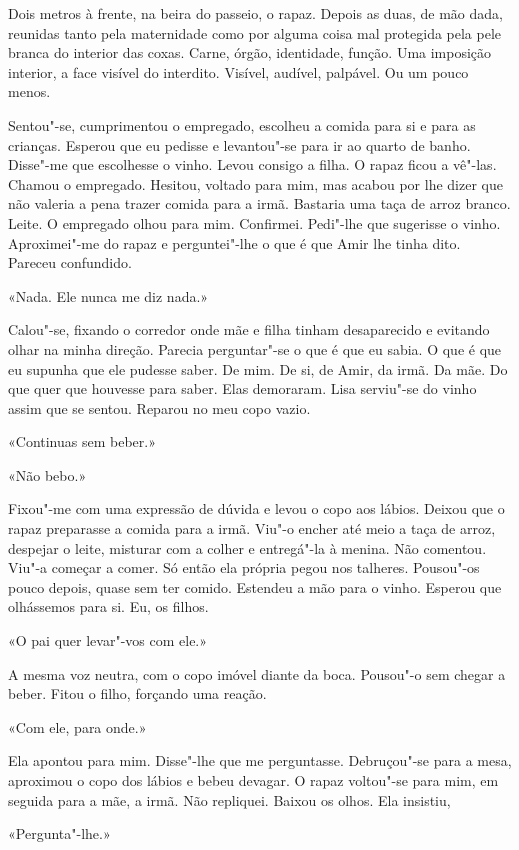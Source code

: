 Dois metros à frente, na beira do passeio, o rapaz. Depois as duas, de
mão dada, reunidas tanto pela maternidade como por alguma coisa mal
protegida pela pele branca do interior das coxas. Carne, órgão,
identidade, função. Uma imposição interior, a face visível do interdito.
Visível, audível, palpável. Ou um pouco menos.

Sentou"-se, cumprimentou o empregado, escolheu a comida para si e para
as crianças. Esperou que eu pedisse e levantou"-se para ir ao quarto de
banho. Disse"-me que escolhesse o vinho. Levou consigo a filha. O rapaz
ficou a vê"-las. Chamou o empregado. Hesitou, voltado para mim, mas
acabou por lhe dizer que não valeria a pena trazer comida para a irmã.
Bastaria uma taça de arroz branco. Leite. O empregado olhou para mim.
Confirmei. Pedi"-lhe que sugerisse o vinho. Aproximei"-me do rapaz e
perguntei"-lhe o que é que Amir lhe tinha dito. Pareceu confundido.

«Nada. Ele nunca me diz nada.»

Calou"-se, fixando o corredor onde mãe e filha tinham desaparecido e
evitando olhar na minha direção. Parecia perguntar"-se o que é que eu
sabia. O que é que eu supunha que ele pudesse saber. De mim. De si, de
Amir, da irmã. Da mãe. Do que quer que houvesse para saber. Elas
demoraram. Lisa serviu"-se do vinho assim que se sentou. Reparou no meu
copo vazio.

«Continuas sem beber.»

«Não bebo.»

Fixou"-me com uma expressão de dúvida e levou o copo aos lábios. Deixou
que o rapaz preparasse a comida para a irmã. Viu"-o encher até meio a
taça de arroz, despejar o leite, misturar com a colher e entregá"-la à
menina. Não comentou. Viu"-a começar a comer. Só então ela própria pegou
nos talheres. Pousou"-os pouco depois, quase sem ter comido. Estendeu a
mão para o vinho. Esperou que olhássemos para si. Eu, os filhos.

«O pai quer levar"-vos com ele.»

A mesma voz neutra, com o copo imóvel diante da boca. Pousou"-o sem
chegar a beber. Fitou o filho, forçando uma reação.

«Com ele, para onde.»

Ela apontou para mim. Disse"-lhe que me perguntasse. Debruçou"-se para a
mesa, aproximou o copo dos lábios e bebeu devagar. O rapaz voltou"-se
para mim, em seguida para a mãe, a irmã. Não repliquei. Baixou os olhos.
Ela insistiu,

«Pergunta"-lhe.»

